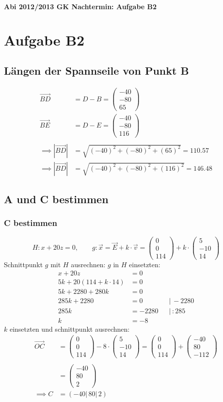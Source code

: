 \documentclass[a4paper,12pt]{article}
\newcommand{\Uebungsblatt}{Abi 2012/2013 GK Nachtermin: Aufgabe B2}
\newcommand{\vectr}[3]{\begin{pmatrix}#1\\#2\\#3
\end{pmatrix}}
\begin{document}
	\thispagestyle{fancy}
	\pagestyle{fancy}
	\begin{center}
		\LARGE \sf \textbf{ \Uebungsblatt{}}
	\end{center}
	\vspace*{0.1cm}
	\tableofcontents
	\newpage
	\thispagestyle{fancy}
	\setcounter{section}{1}
	\section{Aufgabe B2}
	\subsection{Längen der Spannseile von Punkt B}
		\begin{align*}
			\vec{BD}&= D - B = \vectr{-40}{-80}{65}\\
			\vec{BE}&= D - E = \vectr{-40}{-80}{116}\\\\
			\implies \left|\vec{BD}\right| &= \sqrt{ (-40)^2 + (-80)^2 + (65)^2}=110.57\\
			\implies \left|\vec{BD}\right| &= \sqrt{ (-40)^2 + (-80)^2 + (116)^2}=146.48
		\end{align*}
	\newpage
	\subsection{A und C bestimmen}
		\subsubsection{C bestimmen}
		\[H: x+20z=0,\qquad g: \vec{x}=\vec{E}+ k \cdot \vec{v}=\vectr{0}{0}{114} + k\cdot \vectr{5}{-10}{14}\]
		Schnittpunkt $g$ mit $H$ ausrechnen: $g$ in $H$ einsetzten:
		\begin{align*}
			x+20z&=0\\
			5k + 20(114 + k\cdot 14) &= 0&&\\
			5k + 2280 + 280k &= 0&&\\
			285k + 2280&=0&& \vert \,-2280\\
			285k &=- 2280 &&\vert \,:285\\
			k&=-8 
		\end{align*} 
		$k$ einsetzten und schnittpunkt ausrechnen:
		\begin{align*}
			\vec{OC}&=\vectr{0}{0}{114} -8\cdot \vectr{5}{-10}{14}=\vectr{0}{0}{114} + \vectr{-40}{80}{-112}\\\\
			&=\vectr{-40}{80}{2}\\
			\implies C&=(-40|\,80|\,2)
		\end{align*}
\end{document}
